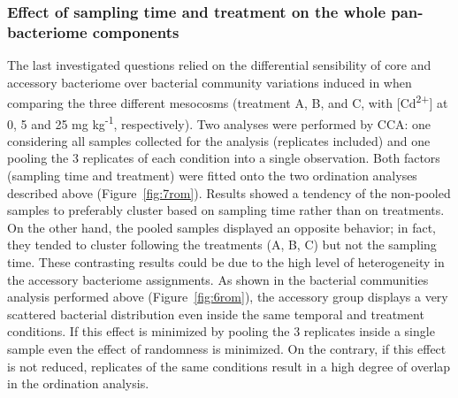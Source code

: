 \subsubsection{Effect of sampling time and treatment on the whole pan-bacteriome components}
The last investigated questions relied on the differential sensibility of core and accessory bacteriome over bacterial community variations induced in when comparing the three different mesocosms (treatment A, B, and C, with [Cd\textsuperscript{2+}] at 0, 5 and 25 mg kg\textsuperscript{-1}, respectively). Two analyses were performed by CCA: one considering all samples collected for the analysis (replicates included) and one pooling the 3 replicates of each condition into a single observation. Both factors (sampling time and treatment) were fitted onto the two ordination analyses described above (Figure~\ref{fig:7rom}). Results showed a tendency of the non-pooled samples to preferably cluster based on sampling time rather than on treatments. On the other hand, the pooled samples displayed an opposite behavior; in fact, they tended to cluster following the treatments (A, B, C) but not the sampling time. These contrasting results could be due to the high level of heterogeneity in the accessory bacteriome assignments. As shown in the bacterial communities analysis performed above (Figure~\ref{fig:6rom}), the accessory group displays a very scattered bacterial distribution even inside the same temporal and treatment conditions. If this effect is minimized by pooling the 3 replicates inside a single sample even the effect of randomness is minimized. On the contrary, if this effect is not reduced, replicates of the same conditions result in a high degree of overlap in the ordination analysis.\\

